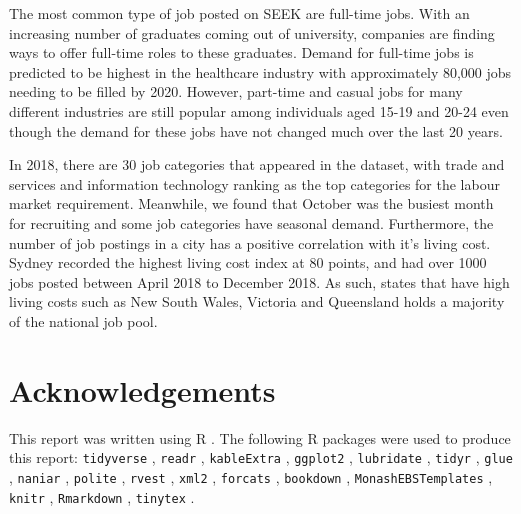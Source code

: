 \documentclass[11pt,a4paper,]{article}
\begin{document}
The most common type of job posted on SEEK are full-time jobs. With an increasing number of graduates coming out of university, companies are finding ways to offer full-time roles to these graduates. Demand for full-time jobs is predicted to be highest in the healthcare industry with approximately 80,000 jobs needing to be filled by 2020. However, part-time and casual jobs for many different industries are still popular among individuals aged 15-19 and 20-24 even though the demand for these jobs have not changed much over the last 20 years.

In 2018, there are 30 job categories that appeared in the dataset, with trade and services and information technology ranking as the top categories for the labour market requirement. Meanwhile, we found that October was the busiest month for recruiting and some job categories have seasonal demand. Furthermore, the number of job postings in a city has a positive correlation with it's living cost. Sydney recorded the highest living cost index at 80 points, and had over 1000 jobs posted between April 2018 to December 2018. As such, states that have high living costs such as New South Wales, Victoria and Queensland holds a majority of the national job pool.

\hypertarget{acknowledgements}{%
\section{Acknowledgements}\label{acknowledgements}}

This report was written using R \autocite{Rcite}. The following R packages were used to produce this report: \texttt{tidyverse} \autocite{Rtidyverse}, \texttt{readr} \autocite{Readr}, \texttt{kableExtra} \autocite{Rkable}, \texttt{ggplot2} \autocite{Rggplot2}, \texttt{lubridate} \autocite{Rlubridate}, \texttt{tidyr} \autocite{Rtidyr}, \texttt{glue} \autocite{Rglue}, \texttt{naniar} \autocite{Rnaniar}, \texttt{polite} \autocite{Rpolite}, \texttt{rvest} \autocite{Rvest}, \texttt{xml2} \autocite{Rxml}, \texttt{forcats} \autocite{Rforcats}, \texttt{bookdown} \autocite{Rbookdown}, \texttt{MonashEBSTemplates} \autocite{monashebstemplate}, \texttt{knitr} \autocite{knitr}, \texttt{Rmarkdown} \autocite{rmarkdown}, \texttt{tinytex} \autocite{tinytex}.

\clearpage

\printbibliography[title=References]
\end{document}
